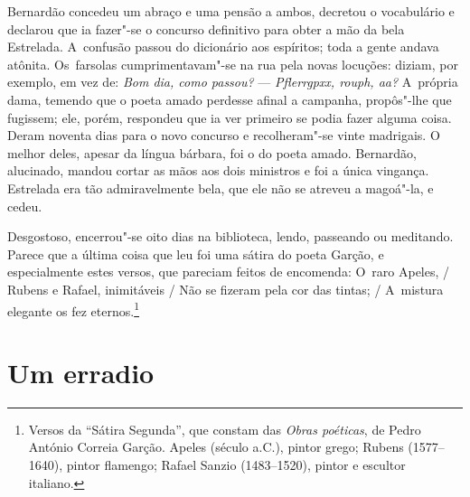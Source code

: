 \begin{linenumbers}
Bernardão concedeu um abraço e uma pensão a ambos, decretou o
vocabulário e declarou que ia fazer"-se o concurso definitivo para obter
a mão da bela Estrelada. A~confusão passou do dicionário aos espíritos;
toda a gente andava atônita. Os~farsolas cumprimentavam"-se na rua pela
novas locuções: diziam, por exemplo, em vez de: \emph{Bom dia, como
passou?} --- \emph{Pflerrgpxx, rouph, aa?} A~própria dama, temendo que o
poeta amado perdesse afinal a campanha, propôs"-lhe que fugissem; ele,
porém, respondeu que ia ver primeiro se podia fazer alguma coisa. Deram
noventa dias para o novo concurso e recolheram"-se vinte madrigais. O
melhor deles, apesar da língua bárbara, foi o do poeta amado. Bernardão,
alucinado, mandou cortar as mãos aos dois ministros e foi a única
vingança. Estrelada era tão admiravelmente bela, que ele não se atreveu
a magoá"-la, e cedeu.

Desgostoso, encerrou"-se oito dias na biblioteca, lendo, passeando ou
meditando. Parece que a última coisa que leu foi uma sátira do poeta
Garção, e especialmente estes versos, que pareciam feitos de encomenda:
O~raro Apeles, / Rubens e Rafael, inimitáveis / Não se fizeram pela cor
das tintas; / A~mistura elegante os fez eternos.\footnote{Versos da
  ``Sátira Segunda'', que constam das \emph{Obras poéticas}, de Pedro
  António Correia Garção. Apeles (século  a.C.), pintor grego; Rubens
  (1577--1640), pintor flamengo; Rafael Sanzio (1483--1520), pintor e
  escultor italiano.} \enlargethispage{\baselineskip}

\end{linenumbers}

\chapter{Um erradio}

